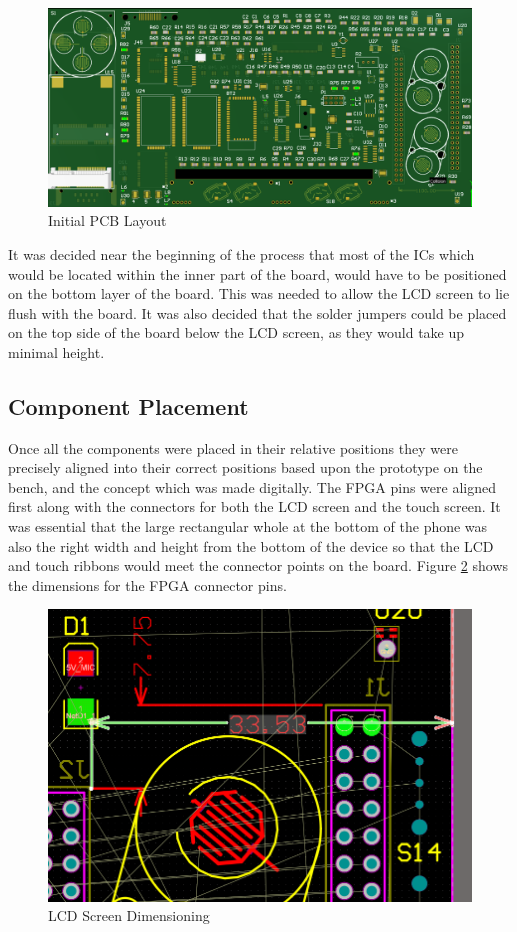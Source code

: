 \begin{figure}
	\includegraphics[width=\linewidth]{Figures/PCB.png}
	\caption{Initial PCB Layout}
	\label{fig:Initial_PCB}
\end{figure}

	It was decided near the beginning of the process that most of the ICs which would be located within the inner part of the board, would have to be positioned on the bottom layer of the board. 
This was needed to allow the LCD screen to lie flush with the board. 
It was also decided that the solder jumpers could be placed on the top side of the board below the LCD screen, as they would take up minimal height.\\

\subsection{Component Placement}
	Once all the components were placed in their relative positions they were precisely aligned into their correct positions based upon the prototype on the bench, and the concept which was made digitally. 
The FPGA pins were aligned first along with the connectors for both the LCD screen and the touch screen. 
It was essential that the large rectangular whole at the bottom of the phone was also the right width and height from the bottom of the device so that the LCD and touch ribbons would meet the connector points on the board. 
Figure \ref{fig:component_placement} shows the dimensions for the FPGA connector pins. 

\begin{figure}
	\includegraphics[width=\linewidth]{Figures/component_placement.png}\centering
	\caption{LCD Screen Dimensioning}
	\label{fig:component_placement}
\end{figure}


